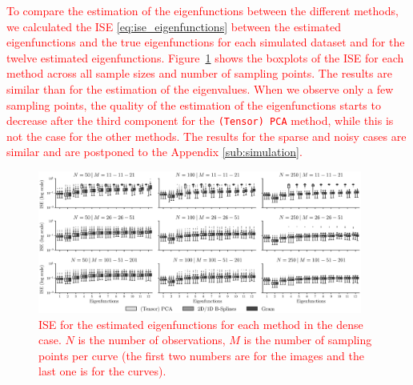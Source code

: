 \begin{results}
\textcolor{red}{To compare the estimation of the eigenfunctions between the different methods, we calculated the ISE \eqref{eq:ise_eigenfunctions} between the estimated eigenfunctions and the true eigenfunctions for each simulated dataset and for the twelve estimated eigenfunctions. Figure~\ref{fig:ise_mfd_1d} shows the boxplots of the ISE for each method across all sample sizes and number of sampling points. The results are similar than for the estimation of the eigenvalues. When we observe only a few sampling points, the quality of the estimation of the eigenfunctions starts to decrease after the third component for the \texttt{(Tensor) PCA} method, while this is not the case for the other methods. The results for the sparse and noisy cases are similar and are postponed to the Appendix \ref{sub:simulation}.}
\begin{figure}
     \centering
    \includegraphics[width=0.95\textwidth]{figures/ISE.eps}
    \caption{\textcolor{red}{ISE for the estimated eigenfunctions for each method in the dense case. $N$ is the number of observations, $M$ is the number of sampling points per curve (the first two numbers are for the images and the last one is for the curves).}}
    \label{fig:ise_mfd_1d}
\end{figure}
\end{results}

